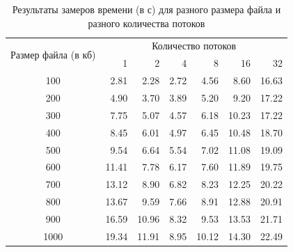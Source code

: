 \begin{table}[h]
	\begin{center}
		\begin{threeparttable}
			\captionsetup{justification=raggedright,singlelinecheck=off}
			\caption{Результаты замеров времени (в с) для разного размера файла и разного количества потоков}
			\label{tbl:time_mes_par}
			\begin{tabular}{|c|r|r|r|r|r|r|}
				\hline            
				\multirow{2}{*}{Размер файла (в кб)}& \multicolumn{6}{c|}{Количество потоков} \\
				\cline{2-7}
				& 1 & 2 & 4 & 8 & 16 & 32 \\
				\hline
				100 & 2.81 & 2.28 & 2.72 & 4.56 & 8.60 & 16.63 \\ 
				\hline
				200 & 4.90 & 3.70 & 3.89 & 5.20 & 9.20 & 17.22 \\ 
				\hline
				300 & 7.75 & 5.07 & 4.57 & 6.18 & 10.23 & 17.22 \\ 
				\hline
				400 & 8.45 & 6.01 & 4.97 & 6.45 & 10.48 & 18.70 \\ 
				\hline
				500 & 9.54 & 6.64 & 5.54 & 7.02 & 11.08 & 19.09 \\ 
				\hline
				600 & 11.41 & 7.78 & 6.17 & 7.60 & 11.89 & 19.75 \\ 
				\hline
				700 & 13.12 & 8.90 & 6.82 & 8.23 & 12.25 & 20.22 \\ 
				\hline
				800 & 13.67 & 9.59 & 7.66 & 8.91 & 12.88 & 20.91 \\ 
				\hline
				900 & 16.59 & 10.96 & 8.32 & 9.53 & 13.53 & 21.71 \\ 
				\hline
				1000 & 19.34 & 11.91 & 8.95 & 10.12 & 14.30 & 22.49 \\ 
				\hline
			\end{tabular}
		\end{threeparttable}
	\end{center}
\end{table}

\clearpage

